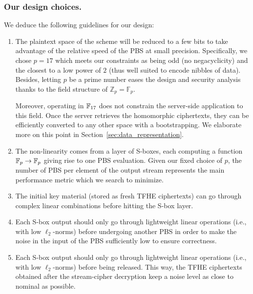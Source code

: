 \subsubsection{Our design choices.} 
We deduce the following guidelines for our design:
\begin{enumerate}
\item The plaintext space of the scheme will be reduced to a few bits to take advantage of the relative speed of the PBS at small precision. Specifically, we chose $p=17$ which meets our constraints as being odd (no negacyclicity) and the closest to a low power of $2$ (thus well suited to encode nibbles of data). Besides, letting $p$ be a prime number eases the design and security analysis thanks to the field structure of $\mathbb{Z}_p = \mathbb{F}_p$.
  
Moreover, operating in $\mathbb{F}_{17}$ does not constrain the server-side application to this field. Once the server retrieves the homomorphic ciphertexts, they can be efficiently converted to any other space with a bootstrapping. We elaborate more on this point in Section~\ref{sec:data_representation}. 

  \item The non-linearity comes from a layer of S-boxes, each computing a function $\mathbb{F}_{p} \to \mathbb{F}_{p}$  giving rise to one PBS evaluation. Given our fixed choice of $p$, the number of PBS per element of the output stream represents the main performance metric which we search to minimize. 

  
  \item The initial key material (stored as fresh TFHE ciphertexts) can go through complex linear combinations
  before hitting the S-box layer.
  
  \item Each S-box output should only go through lightweight linear operations (i.e., with low $\ell_2$-norms) before undergoing another PBS in order to make the noise in the input of the PBS sufficiently low to ensure correctness.

  
  \item Each S-box output should only go through lightweight linear operations (i.e., with low $\ell_2$-norms) before being
  released. This way, the TFHE ciphertexts obtained after the stream-cipher decryption keep a noise level as close to nominal as possible.
\end{enumerate}

